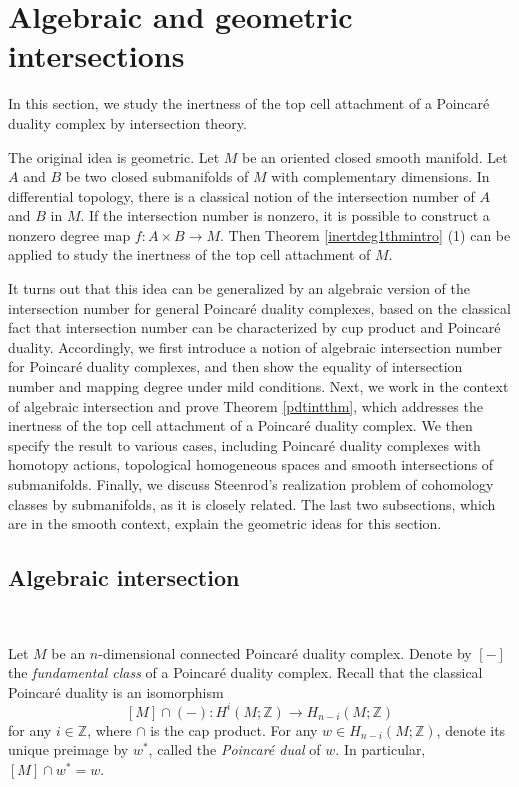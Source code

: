 \documentclass[a4]{amsart}
\theoremstyle{definition}
\begin{document}
\begin{sloppypar}
\section{Algebraic and geometric intersections}
\label{sec: int}
In this section, we study the inertness of the top cell attachment of a Poincar\'{e} duality complex by intersection theory. 

The original idea is geometric. Let $M$ be an oriented closed smooth manifold. Let $A$ and $B$ be two closed submanifolds of $M$ with complementary dimensions. In differential topology, there is a classical notion of the intersection number of $A$ and $B$ in $M$. If the intersection number is nonzero, it is possible to construct a nonzero degree map $f: A\times B\stackrel{}{\longrightarrow} M$. Then Theorem \ref{inertdeg1thmintro} (1) can be applied to study the inertness of the top cell attachment of $M$. 

It turns out that this idea can be generalized by an algebraic version of the intersection number for general Poincar\'{e} duality complexes, based on the classical fact that intersection number can be characterized by cup product and Poincar\'{e} duality. Accordingly, we first introduce a notion of algebraic intersection number for Poincar\'{e} duality complexes, and then show the equality of intersection number and mapping degree under mild conditions. Next, we work in the context of algebraic intersection and prove Theorem \ref{pdtintthm}, which addresses the inertness of the top cell attachment of a Poincaré duality complex. We then specify the result to various cases, including Poincar\'{e} duality complexes with homotopy actions, topological homogeneous spaces and smooth intersections of submanifolds. Finally, we discuss Steenrod's realization problem of cohomology classes by submanifolds, as it is closely related. The last two subsections, which are in the smooth context, explain the geometric ideas for this section.  
\subsection{Algebraic intersection}
\label{subsec: alg-int}

$\, $

Let $M$ be an $n$-dimensional connected Poincar\'{e} duality complex. Denote by $[-]$ the {\it fundamental class} of a Poincar\'{e} duality complex. Recall that the classical Poincar\'{e} duality is an isomorphism
\[
[M]\cap (-): H^{i}(M;\mathbb{Z})\stackrel{}{\longrightarrow} H_{n-i}(M;\mathbb{Z})
\]
for any $i\in \mathbb{Z}$, where $\cap$ is the cap product. For any $w\in  H_{n-i}(M;\mathbb{Z})$, denote its unique preimage by $w^\ast$, called the {\it Poincar\'{e} dual} of $w$. In particular, $[M]\cap w^\ast=w$. 



\end{sloppypar}
\end{document}
